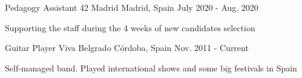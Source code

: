 

\begin{cventries}

  \cventry
    {Pedagogy Assistant} %
    {42 Madrid} %
    {Madrid, Spain} %
    {July 2020 - Aug. 2020} %
    {
      \begin{cvitems} %
        \item {Supporting the staff during the 4 weeks of new candidates selection}
      \end{cvitems}
    }

  \cventry
    {Guitar Player} %
    {Viva Belgrado} %
    {Córdoba, Spain} %
    {Nov. 2011 - Current} %
    {
      \begin{cvitems} %
        \item {Self-managed band. Played international shows and some big festivals in Spain}
      \end{cvitems}
    }

\end{cventries}
